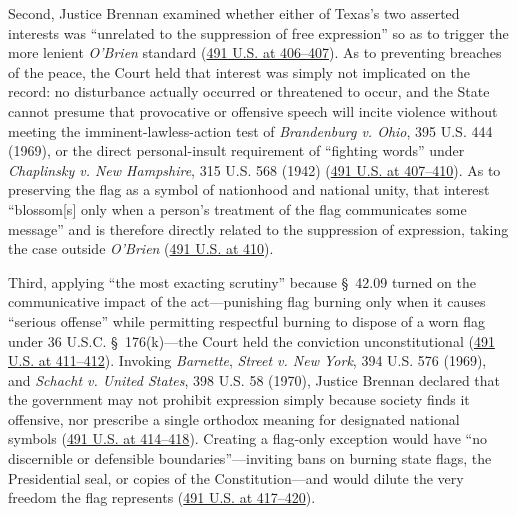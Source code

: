 \documentclass[12pt]{article}
\begin{document}
Second, Justice Brennan examined whether either of Texas's two asserted interests was ``unrelated to the suppression of free expression'' so as to trigger the more lenient \textit{O'Brien} standard (\href{https://supreme.justia.com/cases/federal/us/491/397/}{491 U.S. at 406--407}). As to preventing breaches of the peace, the Court held that interest was simply not implicated on the record: no disturbance actually occurred or threatened to occur, and the State cannot presume that provocative or offensive speech will incite violence without meeting the imminent-lawless-action test of \textit{Brandenburg v. Ohio}, 395 U.S. 444 (1969), or the direct personal-insult requirement of ``fighting words'' under \textit{Chaplinsky v. New Hampshire}, 315 U.S. 568 (1942) (\href{https://supreme.justia.com/cases/federal/us/491/397/}{491 U.S. at 407--410}). As to preserving the flag as a symbol of nationhood and national unity, that interest ``blossom[s] only when a person's treatment of the flag communicates some message'' and is therefore directly related to the suppression of expression, taking the case outside \textit{O'Brien} (\href{https://supreme.justia.com/cases/federal/us/491/397/}{491 U.S. at 410}).

Third, applying ``the most exacting scrutiny'' because \S~42.09 turned on the communicative impact of the act---punishing flag burning only when it causes ``serious offense'' while permitting respectful burning to dispose of a worn flag under 36 U.S.C. \S~176(k)---the Court held the conviction unconstitutional (\href{https://supreme.justia.com/cases/federal/us/491/397/}{491 U.S. at 411--412}). Invoking \textit{Barnette}, \textit{Street v. New York}, 394 U.S. 576 (1969), and \textit{Schacht v. United States}, 398 U.S. 58 (1970), Justice Brennan declared that the government may not prohibit expression simply because society finds it offensive, nor prescribe a single orthodox meaning for designated national symbols (\href{https://supreme.justia.com/cases/federal/us/491/397/}{491 U.S. at 414--418}). Creating a flag-only exception would have ``no discernible or defensible boundaries''---inviting bans on burning state flags, the Presidential seal, or copies of the Constitution---and would dilute the very freedom the flag represents (\href{https://supreme.justia.com/cases/federal/us/491/397/}{491 U.S. at 417--420}).
\end{document}
